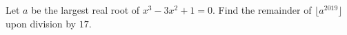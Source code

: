 Let $a$ be the largest real root of $x^3-3x^2+1=0$. Find the remainder of $\lfloor a^{2019}\rfloor$ upon division by $17$.
